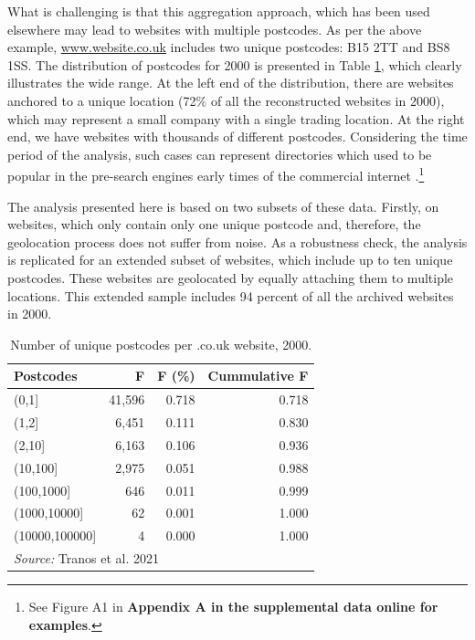 \documentclass[
  authoryear,
  preprint,
  3p]{elsarticle}
\begin{document}
\noindent What is challenging is that this aggregation approach, which
has been used elsewhere \citep{tranosuk, shoreditch} may lead to
websites with multiple postcodes. As per the above example,
\href{http://www.website.co.uk}{www.website.co.uk} includes two unique
postcodes: B15 2TT and BS8 1SS. The distribution of postcodes for 2000
is presented in Table \ref{f2000}, which clearly illustrates the wide
range. At the left end of the distribution, there are websites anchored
to a unique location (72\% of all the reconstructed websites in 2000),
which may represent a small company with a single trading location. At
the right end, we have websites with thousands of different postcodes.
Considering the time period of the analysis, such cases can represent
directories which used to be popular in the pre-search engines early
times of the commercial internet \citep{tranosuk}.\footnote{See Figure
  A1 in \textbf{Appendix A in the supplemental data online for
  examples}.}

The analysis presented here is based on two subsets of these data.
Firstly, on websites, which only contain only one unique postcode and,
therefore, the geolocation process does not suffer from noise. As a
robustness check, the analysis is replicated for an extended subset of
websites, which include up to ten unique postcodes. These websites are
geolocated by equally attaching them to multiple locations. This
extended sample includes 94 percent of all the archived websites in
2000.

\begin{table}

\caption{\label{tab:unnamed-chunk-1}Number of unique postcodes per .co.uk website, 2000.\label{f2000}}
\centering
\begin{tabular}[t]{lrrr}
\toprule
Postcodes & F & F (\%) & Cummulative F\\
\midrule
(0,1] & 41,596 & 0.718 & 0.718\\
(1,2] & 6,451 & 0.111 & 0.830\\
(2,10] & 6,163 & 0.106 & 0.936\\
(10,100] & 2,975 & 0.051 & 0.988\\
(100,1000] & 646 & 0.011 & 0.999\\
\addlinespace
(1000,10000] & 62 & 0.001 & 1.000\\
(10000,100000] & 4 & 0.000 & 1.000\\
\bottomrule
\multicolumn{4}{l}{\rule{0pt}{1em}\textit{Source: } Tranos et al. 2021}\\
\end{tabular}
\end{table}
\end{document}
